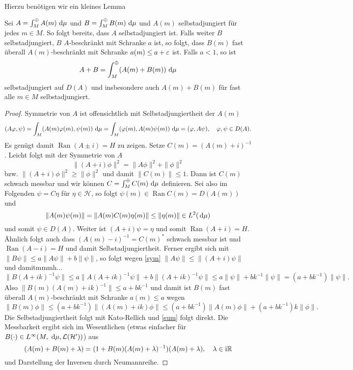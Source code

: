 \documentclass{mywork}
\DeclareMathOperator*{\Ran}{Ran}
\begin{document}
Hierzu benötigen wir ein kleines Lemma
\begin{lem}\label{kato}
Sei $A=\int_{M}^\oplus A(m) \, \dx[\mu]$ und $B=\int_{M}^\oplus B(m)\, \dx[\mu]$ und $A(m)$ selbstadjungiert für jedes $m\in M$. So folgt bereits, dass $A$ selbstadjungiert ist. Falls weiter $B$ selbstadjungiert, $B$ $A$-beschränkt mit Schranke $a$ ist, so folgt, dass $B(m)$ fast überall $A(m)$-beschränkt  mit Schranke $a(m)\le a+ \eps$ ist. Falls $a<1$, so ist
\begin{equation} \label{sum}
A+B = \int_M^\oplus (A(m)+B(m))\, \dx[\mu]
\end{equation}
selbstadjungiert auf $D(A)$ und insbesondere auch $A(m)+B(m)$ für fast alle $m\in M$ selbstadjungiert.  
\end{lem}
\begin{proof}
Symmetrie von $A$ ist offensichtlich mit Selbstadjungiertheit der $A(m)$
\[
(A\phi, \psi) =  \int_M (A(m) \phi(m), \psi(m))\, \dx[\mu] = \int_M (\phi(m), A(m) \psi(m))\, \dx[\mu]= (\phi, A\psi), \quad \phi, \psi \in D(A).
\]
Es genügt damit $\Ran(A\pm i)=H$ zu zeigen.  Setze $C(m)= (A(m)+i)^{-1}$. Leicht folgt mit der Symmetrie von $A$
\begin{equation}\label{sym}
\| (A+i)\phi\|^2 = \| A\phi\|^2 + \| \phi\|^2
\end{equation}
bzw. $\|(A+i)\phi\|^2 \ge \| \phi\|^2$ und damit $\|C(m)\|\le 1$. Dann ist $C(m)$ schwach messbar und wir können $C=\int_M^\oplus C(m) \, \dx[\mu]$ definieren.  Sei also im Folgenden $\psi = C\eta$ für $\eta \in \mathcal H$, so folgt $\psi(m) \in \Ran C(m) = D(A(m))$ und
\[
\|A(m) \psi(m)\| = \|A(m) C(m) \eta(m)\| \le \| \eta(m)\| \in L^2(\dx[\mu])
\]
und somit $\psi\in D(A)$.  Weiter ist $(A+i)\psi = \eta$ und somit $\Ran(A+i)=H$. Ähnlich folgt auch dass $(A(m)-i)^{-1} = C(m)^*$ schwach messbar ist und $\Ran(A-i)=H$ und damit Selbstadjungiertheit. Ferner ergibt sich mit $\| B\psi\| \le a \| A\psi\| + b \| \psi\|$, so folgt wegen \eqref{sym} $\| A\psi\|\le \|(A+i)\psi\|$ und damitmmmh...  
\[
\| B(A+ik)^{-1}\psi\| \le a\| A(A+ik)^{-1}\psi\| + b \| (A+ik)^{-1} \psi\| 
\le a \| \psi\|+ bk^{-1} \| \psi\|
= (a+bk^{-1}) \| \psi\|.    
\]
Also $\| B(m) (A(m) +ik)^{-1}\| \le a+bk^{-1}$ und damit ist $B(m)$ fast überall $A(m)$-beschränkt mit Schranke $a(m) \le a$ wegen
\[
\|B(m) \phi\| \le (a+bk^{-1}) \| (A(m) +ik)\phi\| \le (a+bk^{-1}) \| A(m) \phi\| + (a+bk^{-1})k \| \phi\|.
\]
Die Selbstadjungiertheit folgt mit Kato-Rellich und \eqref{sum} folgt direkt. Die Messbarkeit ergibt sich im Wesentlichen (etwas einfacher für $B(\cdot)\in L^\infty(M, \, \dx[\mu], \mathcal L(\mathcal H'))$) aus
\begin{equation}\label{trick}
(A(m)+B(m)+\lambda) = (1+ B(m)(A(m)+\lambda)^{-1})(A(m)+ \lambda), \quad \lambda \in \mathrm i \R
\end{equation}
und Darstellung der Inversen durch Neumannreihe. 
\end{proof}
\end{document}
